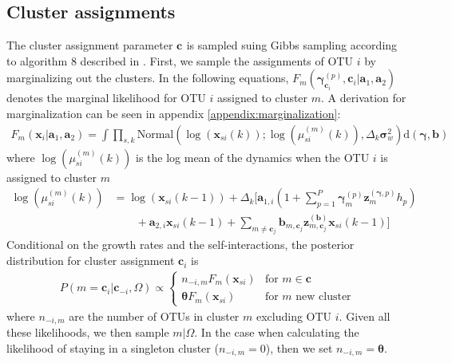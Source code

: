 \documentclass{article}
\newcommand{\Normaldist}{\text{Normal}}
\newcommand{\ci}[1]{\mathbf{c}_{#1}}
\newcommand{\concc}{\mathbf{\theta}}
\newcommand{\growth}{\mathbf{a}_1}
\newcommand{\growthi}[1]{\mathbf{a}_{1,#1}}
\newcommand{\si}{\mathbf{a}_2}
\newcommand{\sii}[1]{\mathbf{a}_{2,#1}}
\newcommand{\interact}{\mathbf{b}}
\newcommand{\interactij}[2]{\interact_{#1, #2}}
\newcommand{\zinteractij}[2]{\mathbf{z}^{(\interact)}_{#1, #2}}
\newcommand{\pert}{\mathbf{\gamma}}
\newcommand{\pertic}[2]{\mathbf{\gamma}^{(#1)}_{\ci{#2}}} %
\newcommand{\zperti}[1]{\mathbf{z}^{(\pert, #1)}}
\newcommand{\stepperti}[1]{h_{#1}}
\newcommand{\pv}{\mathbf{\sigma}_w^2}
\newcommand{\musikexp}[4]{\mu^{#4}_{#1 #2}(#3)}
\newcommand{\xsik}[3]{\mathbf{x}_{#1 #2}(#3)}
\newcommand{\xii}[1]{\mathbf{x}_{#1}}
\newcommand{\dt}{\Delta_k}
\begin{document}
\subsection{Cluster assignments}
The cluster assignment parameter $\ci{}$ is sampled suing Gibbs sampling according to algorithm 8 described in \cite{cite:neal2000}. First, we sample the assignments of OTU $i$ by marginalizing out the clusters. In the following equations, $F_m (\pertic{p}{i}, \ci{i} | \growth , \si )$ denotes the marginal likelihood for OTU $i$ assigned to cluster $m$. A derivation for marginalization can be seen in appendix \ref{appendix:marginalization}:
\begin{align}
    F_m (\xii{i} | \growth , \si ) = \int
        \prod_{s,k} \Normaldist \left(
            \log (\xsik{s}{i}{k} );
            \log (\musikexp{s}{i}{k}{(m)}) ,
            \dt \pv
        \right)
        \text{d}(\pert, \interact)
\end{align}
where $\log ( \musikexp{s}{i}{k}{(m)} )$ is the log mean of the dynamics when the OTU $i$ is assigned to cluster $m$
\begin{align}
    \log(\musikexp{s}{i}{k}{(m)}) & = \log ( \xsik{s}{i}{k-1} ) + 
        \dt \Bigg[
            \growthi{i} \left(
                1 + \sum_{p=1}^P \pert^{(p)}_{m} \zperti{p}_{m} \stepperti{p}
            \right) \\
            & \quad \quad + \sii{i} \xsik{s}{i}{k-1} +
            \sum_{m \neq \ci{j}} 
                \interactij{m}{\ci{j}}
                \zinteractij{m}{\ci{j}}
                \xsik{s}{i}{k-1}
        \Bigg] \nonumber 
\end{align}
Conditional on the growth rates and the self-interactions, the posterior distribution for cluster assignment $\ci{i}$ is
\begin{align}
    P(m=\ci{i} | \ci{-i}, \Omega) \propto \begin{cases}
        n_{-i,m} F_m(\xii{si}) & \text{for } m \in \ci{} \\
        \concc F_m (\xii{si}) & \text{for } m \text{ new cluster}
    \end{cases}
\end{align}
where $n_{-i,m}$ are the number of OTUs in cluster $m$ excluding OTU $i$. Given all these likelihoods, we then sample $m|\Omega$. In the case when calculating the likelihood of staying in a singleton cluster ($n_{-i,m}=0$), then we set $n_{-i,m}=\concc$.
\end{document}
